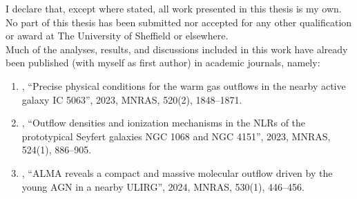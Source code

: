 I declare that, except where stated, all work presented in this thesis is my own. No part of this thesis has been submitted nor accepted for any other qualification or award at The University of Sheffield or elsewhere. \\

\noindent
Much of the analyses, results, and discussions included in this work have already been published (with myself as first author) in academic journals, namely: \\
\begin{enumerate}
    \item \citet{Holden2023}, ``Precise physical conditions for the warm gas outflows in the nearby active galaxy IC 5063'', 2023, MNRAS, 520(2), 1848--1871. \\
    \item \citet{HoldenTadhunter2023}, ``Outflow densities and ionization mechanisms in the NLRs of the prototypical Seyfert galaxies NGC 1068 and NGC 4151'', 2023, MNRAS, 524(1), 886--905. \\
    \item \citet{Holden2024}, ``ALMA reveals a compact and massive molecular outflow driven by the young AGN in a nearby ULIRG'', 2024, MNRAS, 530(1), 446--456.
\end{enumerate}